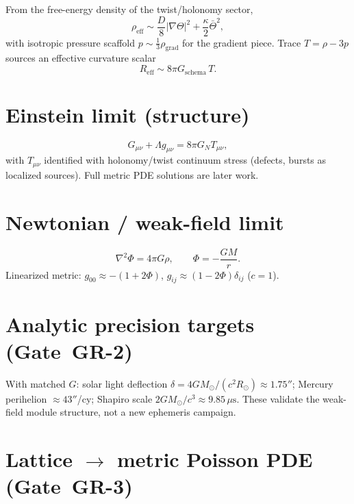 \documentclass[11pt]{article}
\begin{document}
From the free-energy density of the twist/holonomy sector,
\begin{equation}
\rho_{\mathrm{eff}}
\sim \frac{D}{8}|\nabla\Theta|^{2}
+\frac{\kappa}{2}\bar\Theta^{2},
\label{eq:rho-eff}
\end{equation}
with isotropic pressure scaffold $p\sim\tfrac13\rho_{\mathrm{grad}}$ for the gradient piece.
Trace $T=\rho-3p$ sources an effective curvature scalar
\begin{equation}
R_{\mathrm{eff}}\sim 8\pi G_{\mathrm{schema}}\,T.
\label{eq:R-eff}
\end{equation}

\section{Einstein limit (structure)}

\begin{equation}
G_{\mu\nu}+\Lambda g_{\mu\nu}=8\pi G_N T_{\mu\nu},
\label{eq:einstein}
\end{equation}
with $T_{\mu\nu}$ identified with holonomy/twist continuum stress (defects, bursts as
localized sources). Full metric PDE solutions are later work.

\section{Newtonian / weak-field limit}

\begin{equation}
\nabla^{2}\Phi=4\pi G\rho,
\qquad
\Phi=-\frac{GM}{r}.
\label{eq:newton}
\end{equation}
Linearized metric:
$g_{00}\approx -(1+2\Phi)$, $g_{ij}\approx (1-2\Phi)\delta_{ij}$ ($c=1$).

\section{Analytic precision targets (Gate~GR-2)}

With matched $G$: solar light deflection $\delta=4GM_\odot/(c^{2}R_\odot)\approx 1.75''$;
Mercury perihelion $\approx 43''$/cy; Shapiro scale $2GM_\odot/c^{3}\approx 9.85\,\mu\mathrm{s}$.
These validate the weak-field module structure, not a new ephemeris campaign.

\section{Lattice $\to$ metric Poisson PDE (Gate~GR-3)}
\end{document}
